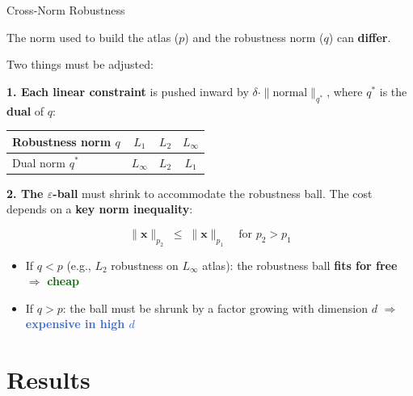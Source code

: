 \documentclass[aspectratio=169, 11pt]{beamer}
\newcommand{\vx}{\mathbf{x}}
\begin{document}
\begin{frame}{Cross-Norm Robustness}

The norm used to build the atlas ($p$) and the robustness norm ($q$) can \textbf{differ}.

Two things must be adjusted:

\bigskip

\textbf{1. Each linear constraint} is pushed inward by $\delta \cdot \|\text{normal}\|_{q^*}$, where $q^*$ is the \textbf{dual} of $q$:

\smallskip
\begin{center}
\begin{tabular}{lccc}
  \toprule
  Robustness norm $q$ & $L_1$ & $L_2$ & $L_\infty$ \\
  \midrule
  Dual norm $q^*$ & $L_\infty$ & $L_2$ & $L_1$ \\
  \bottomrule
\end{tabular}
\end{center}

\bigskip

\textbf{2. The $\varepsilon$-ball} must shrink to accommodate the robustness ball. The cost depends on a \textbf{key norm inequality}:

\[
  \|\vx\|_{p_2} \;\leq\; \|\vx\|_{p_1} \quad\text{for } p_2 > p_1
\]

\begin{itemize}
  \item If $q < p$ (e.g., $L_2$ robustness on $L_\infty$ atlas): the robustness ball \textbf{fits for free} $\Rightarrow$ \textcolor{darkgreen}{\textbf{cheap}}
  \item If $q > p$: the ball must be shrunk by a factor growing with dimension $d$ $\Rightarrow$ \textcolor{highlight}{\textbf{expensive in high $d$}}
\end{itemize}

\end{frame}

\section{Results}
\end{document}
